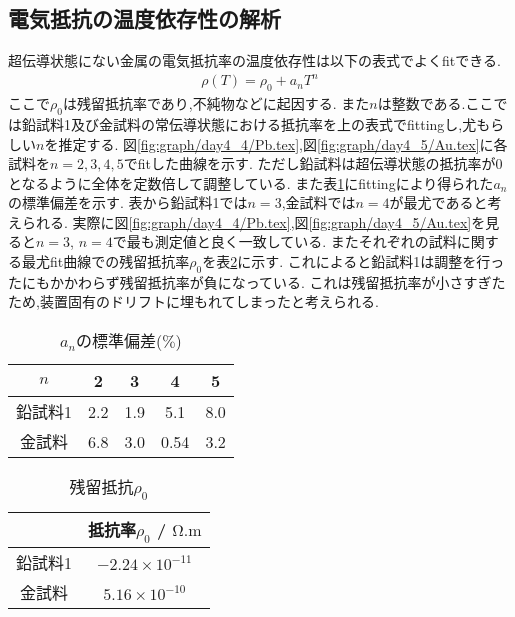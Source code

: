 \subsection{電気抵抗の温度依存性の解析}
超伝導状態にない金属の電気抵抗率の温度依存性は以下の表式でよくfitできる.
\begin{align}
  \rho(T)=\rho_0+a_nT^n
\end{align}
ここで$\rho_0$は残留抵抗率であり,不純物などに起因する.
また$n$は整数である.ここでは鉛試料1及び金試料の常伝導状態における抵抗率を上の表式でfittingし,尤もらしい$n$を推定する.
図\ref{fig:graph/day4_4/Pb.tex},図\ref{fig:graph/day4_5/Au.tex}に各試料を$n=2,3,4,5$でfitした曲線を示す.
ただし鉛試料は超伝導状態の抵抗率が0となるように全体を定数倍して調整している.
また表\ref{tab:an}にfittingにより得られた$a_n$の標準偏差を示す.
表から鉛試料1では$n=3$,金試料では$n=4$が最尤であると考えられる.
実際に図\ref{fig:graph/day4_4/Pb.tex},図\ref{fig:graph/day4_5/Au.tex}を見ると$n=3$, $n=4$で最も測定値と良く一致している.
またそれぞれの試料に関する最尤fit曲線での残留抵抗率$\rho_0$を表\ref{tab:zanryu}に示す.
これによると鉛試料1は調整を行ったにもかかわらず残留抵抗率が負になっている.
これは残留抵抗率が小さすぎたため,装置固有のドリフトに埋もれてしまったと考えられる.
\begin{table}[h]
\caption{$a_n$の標準偏差($\%$)}
\label{tab:an}
\centering
\begin{tabular}{c|cccc}
\hline
$n$&2&3&4&5\\
\hline \hline
鉛試料1&2.2&1.9&5.1&8.0\\
金試料&6.8&3.0&0.54&3.2\\
\hline
\end{tabular}
\end{table}
\begin{table}[h]
\caption{残留抵抗$\rho_0$}
\label{tab:zanryu}
\centering
\begin{tabular}{c|c}
\hline
&抵抗率$\rho_0$ / $\si{\ohm.\metre}$\\
\hline \hline
鉛試料1&$-2.24\times10^{-11}$\\
金試料&$5.16\times10^{-10}$\\
\hline
\end{tabular}
\end{table}
